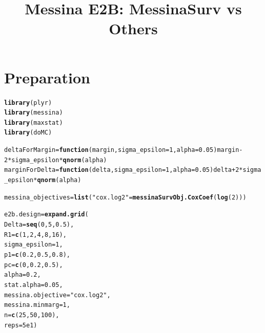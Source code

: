 \documentclass{article}\usepackage[]{graphicx}\usepackage[]{color}
\makeatletter
\newcommand{\hlnum}[1]{\textcolor[rgb]{0.686,0.059,0.569}{#1}}%
\newcommand{\hlstr}[1]{\textcolor[rgb]{0.192,0.494,0.8}{#1}}%
\newcommand{\hlopt}[1]{\textcolor[rgb]{0,0,0}{#1}}%
\newcommand{\hlstd}[1]{\textcolor[rgb]{0.345,0.345,0.345}{#1}}%
\newcommand{\hlkwa}[1]{\textcolor[rgb]{0.161,0.373,0.58}{\textbf{#1}}}%
\newcommand{\hlkwb}[1]{\textcolor[rgb]{0.69,0.353,0.396}{#1}}%
\newcommand{\hlkwc}[1]{\textcolor[rgb]{0.333,0.667,0.333}{#1}}%
\newcommand{\hlkwd}[1]{\textcolor[rgb]{0.737,0.353,0.396}{\textbf{#1}}}%
\newenvironment{kframe}{%
 \def\at@end@of@kframe{}%
 \ifinner\ifhmode%
  \def\at@end@of@kframe{\end{minipage}}%
  \begin{minipage}{\columnwidth}%
 \fi\fi%
 \def\FrameCommand##1{\hskip\@totalleftmargin \hskip-\fboxsep
 \colorbox{shadecolor}{##1}\hskip-\fboxsep
     \hskip-\linewidth \hskip-\@totalleftmargin \hskip\columnwidth}%
 \MakeFramed {\advance\hsize-\width
   \@totalleftmargin\z@ \linewidth\hsize
   \@setminipage}}%
 {\par\unskip\endMakeFramed%
 \at@end@of@kframe}
\newenvironment{knitrout}{}{} %
\makeatother
\begin{document}
\title{Messina E2B: MessinaSurv vs Others}
\maketitle


\section{Preparation}
\begin{knitrout}
\color{fgcolor}\begin{kframe}
\begin{alltt}
\hlkwd{library}\hlstd{(plyr)}
\hlkwd{library}\hlstd{(messina)}
\hlkwd{library}\hlstd{(maxstat)}
\hlkwd{library}\hlstd{(doMC)}

\hlstd{deltaForMargin} \hlkwb{=} \hlkwa{function}\hlstd{(}\hlkwc{margin}\hlstd{,} \hlkwc{sigma_epsilon} \hlstd{=} \hlnum{1}\hlstd{,} \hlkwc{alpha} \hlstd{=} \hlnum{0.05}\hlstd{) margin} \hlopt{-} \hlnum{2}\hlopt{*}\hlstd{sigma_epsilon}\hlopt{*}\hlkwd{qnorm}\hlstd{(alpha)}
\hlstd{marginForDelta} \hlkwb{=} \hlkwa{function}\hlstd{(}\hlkwc{delta}\hlstd{,} \hlkwc{sigma_epsilon} \hlstd{=} \hlnum{1}\hlstd{,} \hlkwc{alpha} \hlstd{=} \hlnum{0.05}\hlstd{) delta} \hlopt{+} \hlnum{2}\hlopt{*}\hlstd{sigma_epsilon}\hlopt{*}\hlkwd{qnorm}\hlstd{(alpha)}

\hlstd{messina_objectives} \hlkwb{=} \hlkwd{list}\hlstd{(}\hlstr{"cox.log2"} \hlstd{=} \hlkwd{messinaSurvObj.CoxCoef}\hlstd{(}\hlkwd{log}\hlstd{(}\hlnum{2}\hlstd{)))}

\hlstd{e2b.design} \hlkwb{=} \hlkwd{expand.grid}\hlstd{(}
        \hlkwc{Delta} \hlstd{=} \hlkwd{seq}\hlstd{(}\hlnum{0}\hlstd{,} \hlnum{5}\hlstd{,} \hlnum{0.5}\hlstd{),}
        \hlkwc{R1} \hlstd{=} \hlkwd{c}\hlstd{(}\hlnum{1}\hlstd{,} \hlnum{2}\hlstd{,} \hlnum{4}\hlstd{,} \hlnum{8}\hlstd{,} \hlnum{16}\hlstd{),}
        \hlkwc{sigma_epsilon} \hlstd{=} \hlnum{1}\hlstd{,}
        \hlkwc{p1} \hlstd{=} \hlkwd{c}\hlstd{(}\hlnum{0.2}\hlstd{,} \hlnum{0.5}\hlstd{,} \hlnum{0.8}\hlstd{),}
        \hlkwc{pc} \hlstd{=} \hlkwd{c}\hlstd{(}\hlnum{0}\hlstd{,} \hlnum{0.2}\hlstd{,} \hlnum{0.5}\hlstd{),}
        \hlkwc{alpha} \hlstd{=} \hlnum{0.2}\hlstd{,}
        \hlkwc{stat.alpha} \hlstd{=} \hlnum{0.05}\hlstd{,}
        \hlkwc{messina.objective} \hlstd{=} \hlstr{"cox.log2"}\hlstd{,}
        \hlkwc{messina.minmarg} \hlstd{=} \hlnum{1}\hlstd{,}
        \hlkwc{n} \hlstd{=} \hlkwd{c}\hlstd{(}\hlnum{25}\hlstd{,} \hlnum{50}\hlstd{,} \hlnum{100}\hlstd{),}
        \hlkwc{reps} \hlstd{=} \hlnum{5e1}\hlstd{)}


\end{alltt}
\end{kframe}
\end{knitrout}
\end{document}
